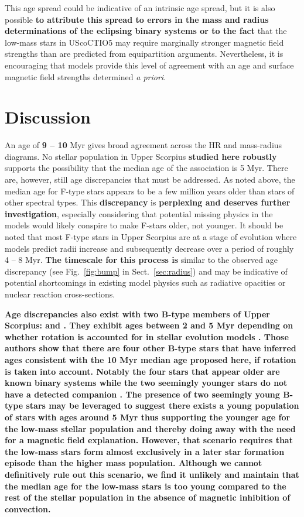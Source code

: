 \documentclass{aa}
\begin{document}
This age spread could be indicative of an intrinsic age spread, but it is also possible {\bf to attribute this spread to errors in the mass and radius determinations of the eclipsing binary systems or to the fact} that the low-mass stars in UScoCTIO5 may require marginally stronger magnetic field strengths than are predicted from equipartition arguments. Nevertheless, it is encouraging that models provide this level of agreement with an age and surface magnetic field strengths determined \emph{a priori}. 


\section{Discussion}
\label{sec:disc}
An age of {\bf 9 -- 10} Myr gives broad agreement across the HR and mass-radius diagrams. No stellar population in Upper Scorpius {\bf studied here robustly} supports the possibility that the median age of the association is 5 Myr. There are, however, still age discrepancies that must be addressed. As noted above, the median age for F-type stars appears to be a few million years older than stars of other spectral types. This {\bf discrepancy} is {\bf perplexing and deserves further investigation}, especially considering that potential missing physics in the models would likely conspire to make F-stars older, not younger. It should be noted that most F-type stars in Upper Scorpius are at a stage of evolution where models predict radii increase and subsequently decrease over a period of roughly 4 -- 8 Myr. {\bf The timescale for this process is} similar to the observed age discrepancy (see Fig.~\ref{fig:bump} in Sect.~\ref{sec:radius}) and may be indicative of potential shortcomings in existing model physics such as radiative opacities or nuclear reaction cross-sections. 

{\bf Age discrepancies also exist with two B-type members of Upper Scorpius:  and . They exhibit ages between 2 and 5 Myr depending on whether rotation is accounted for in stellar evolution models \citep{Pecaut2012}. Those authors show that there are four other B-type stars that have inferred ages consistent with the 10 Myr median age proposed here, if rotation is taken into account. Notably the four stars that appear older are known binary systems while the two seemingly younger stars do not have a detected companion \citep{Pecaut2012}. The presence of two seemingly young B-type stars may be leveraged to suggest there exists a young population of stars with ages around 5 Myr thus supporting the younger age for the low-mass stellar population and thereby doing away with the need for a magnetic field explanation. However, that scenario requires that the low-mass stars form almost exclusively in a later star formation episode than the higher mass population. Although we cannot definitively rule out this scenario, we find it unlikely and maintain that the {\bf median} age for the low-mass stars is too young compared to the rest of the stellar population in the absence of magnetic inhibition of convection.}
\end{document}
